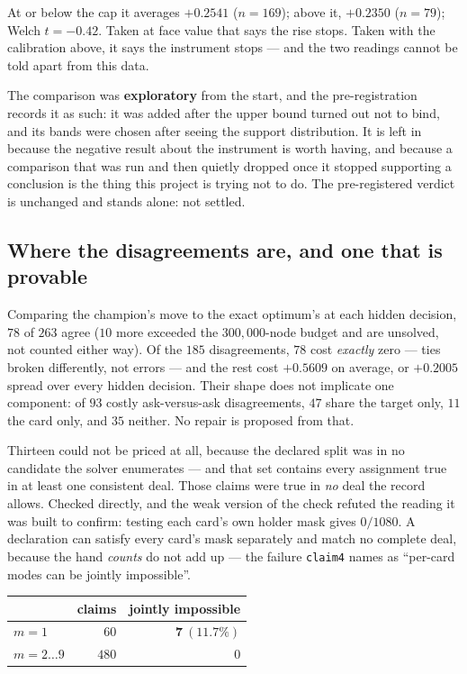\documentclass[11pt,a4paper]{article}
\begin{document}
At or below the cap it averages $+0.2541$ ($n = 169$); above it, $+0.2350$
($n = 79$); Welch $t = -0.42$. Taken at face value that says the rise stops.
Taken with the calibration above, it says the instrument stops --- and the two
readings cannot be told apart from this data.

The comparison was \textbf{exploratory} from the start, and the
pre-registration records it as such: it was added after the upper bound turned
out not to bind, and its bands were chosen after seeing the support
distribution. It is left in because the negative result about the instrument is
worth having, and because a comparison that was run and then quietly dropped
once it stopped supporting a conclusion is the thing this project is trying not
to do. The pre-registered verdict is unchanged and stands alone: not settled.

\subsection{Where the disagreements are, and one that is provable}
\label{sec:iidiff}

Comparing the champion's move to the exact optimum's at each hidden decision,
$78$ of $263$ agree ($10$ more exceeded the $300{,}000$-node budget and are
unsolved, not counted either way). Of the $185$ disagreements, $78$ cost
\emph{exactly} zero --- ties broken differently, not errors --- and the rest cost
$+0.5609$ on average, or $+0.2005$ spread over every hidden decision. Their shape does not implicate one component: of $93$ costly
ask-versus-ask disagreements, $47$ share the target only, $11$ the card only,
and $35$ neither. No repair is proposed from that.

Thirteen could not be priced at all, because the declared split was in no
candidate the solver enumerates --- and that set contains every assignment true
in at least one consistent deal. Those claims were true in \emph{no} deal the
record allows. Checked directly, and the weak version of the check refuted the
reading it was built to confirm: testing each card's own holder mask gives
$0/1080$. A declaration can satisfy every card's mask separately and match no
complete deal, because the hand \emph{counts} do not add up --- the failure
\texttt{claim4} names as ``per-card modes can be jointly impossible''.

\begin{center}
\begin{tabular}{lrr}
\toprule
& claims & jointly impossible \\
\midrule
$m = 1$ & $60$ & $\mathbf{7\ (11.7\%)}$ \\
$m = 2 \dots 9$ & $480$ & $0$ \\
\bottomrule
\end{tabular}
\end{center}
\end{document}

